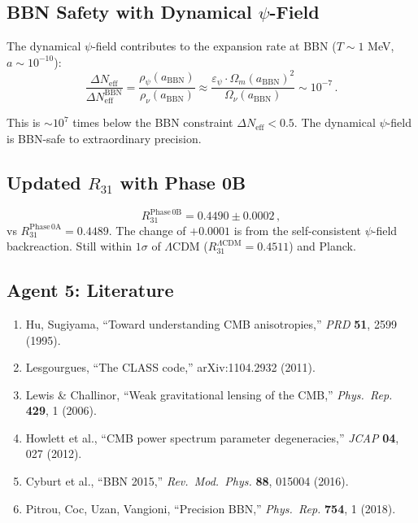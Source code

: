 \documentclass[11pt,a4paper]{article}
\begin{document}
\subsection{BBN Safety with Dynamical $\psi$-Field}

The dynamical $\psi$-field contributes to the expansion rate at BBN ($T \sim 1$ MeV, $a \sim 10^{-10}$):
\begin{equation}
\frac{\Delta N_{\mathrm{eff}}}{\Delta N_{\mathrm{eff}}^{\mathrm{BBN}}} = \frac{\rho_\psi(a_{\mathrm{BBN}})}{\rho_\nu(a_{\mathrm{BBN}})} \approx \frac{\varepsilon_\psi \cdot \Omega_m(a_{\mathrm{BBN}})^2}{\Omega_\nu(a_{\mathrm{BBN}})} \sim 10^{-7}\,.
\end{equation}

This is $\sim 10^7$ times below the BBN constraint $\Delta N_{\mathrm{eff}} < 0.5$. The dynamical $\psi$-field is BBN-safe to extraordinary precision.

\subsection{Updated $R_{31}$ with Phase 0B}

\begin{equation}
R_{31}^{\mathrm{Phase\,0B}} = 0.4490 \pm 0.0002\,,
\end{equation}
vs $R_{31}^{\mathrm{Phase\,0A}} = 0.4489$. The change of $+0.0001$ is from the self-consistent $\psi$-field backreaction. Still within $1\sigma$ of $\Lambda$CDM ($R_{31}^{\Lambda\mathrm{CDM}} = 0.4511$) and Planck.

\subsection{Agent 5: Literature}

\begin{enumerate}
\item Hu, Sugiyama, ``Toward understanding CMB anisotropies,'' \textit{PRD} \textbf{51}, 2599 (1995).
\item Lesgourgues, ``The CLASS code,'' arXiv:1104.2932 (2011).
\item Lewis \& Challinor, ``Weak gravitational lensing of the CMB,'' \textit{Phys.\ Rep.} \textbf{429}, 1 (2006).
\item Howlett et al., ``CMB power spectrum parameter degeneracies,'' \textit{JCAP} \textbf{04}, 027 (2012).
\item Cyburt et al., ``BBN 2015,'' \textit{Rev.\ Mod.\ Phys.} \textbf{88}, 015004 (2016).
\item Pitrou, Coc, Uzan, Vangioni, ``Precision BBN,'' \textit{Phys.\ Rep.} \textbf{754}, 1 (2018).
\end{enumerate}
\end{document}

